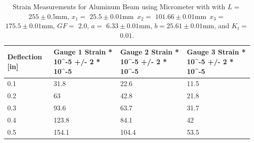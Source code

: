 \documentclass[]{article}
\newcommand{\xOne}{\ensuremath{25.5 \pm 0.01 \si{\milli\meter}}}
\newcommand{\xTwo}{\ensuremath{101.66 \pm 0.01 \si{\milli\meter}}}
\newcommand{\xThree}{\ensuremath{175.5 \pm 0.01 \si{\milli\meter}}}
\newcommand{\GF}{\ensuremath{2.0}}
\newcommand{\Kt}{\ensuremath{0.01}}
\newcommand{\LOne}{\ensuremath{255 \pm 0.5 \si{\milli\meter}}}
\newcommand{\aOne}{\ensuremath{6.33 \pm 0.01 \si{\milli\meter}}}
\newcommand{\bOne}{\ensuremath{25.61 \pm 0.01 \si{\milli\meter}}}
\begin{document}
\begin{table}[H]
    \caption{Strain Measurements for Aluminum Beam using Micrometer with with
    $L=$ \LOne, $x_1=$ \xOne\, $x_2=$ \xTwo\, $x_3=$ \xThree, $GF= $ \GF, $a= $
    \aOne, $b= $\bOne, and $K_t=$ \Kt.
    }\label{tab:strain1}
    \begin{tabular}{@{}p{2cm}p{3cm}p{3cm}p{3cm}@{}}
        \toprule
        Deflection [in] & Gauge 1 Strain *  10\textasciicircum -5 +/- 2 * 10\textasciicircum -5 & Gauge 2 Strain *  10\textasciicircum -5 +/- 2 * 10\textasciicircum -5 & Gauge 3 Strain * 10\textasciicircum -5 +/- 2 * 10\textasciicircum -5 \\ \midrule
        0.1                 & 31.8                                                                  & 22.6                                                                  & 11.5                                                                 \\
        0.2                 & 63                                                                    & 42.8                                                                  & 21.8                                                                 \\
        0.3                 & 93.6                                                                  & 63.7                                                                  & 31.7                                                                 \\
        0.4                 & 123.8                                                                 & 84.1                                                                  & 42                                                                   \\
        0.5                 & 154.1                                                                 & 104.4                                                                 & 53.5                                                                 \\ \bottomrule
    \end{tabular}
\end{table}
\end{document}
